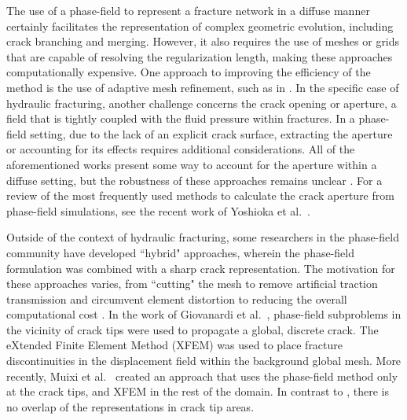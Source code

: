     The use of a phase-field to represent a fracture network in a diffuse manner certainly facilitates the representation of complex geometric evolution, including crack branching and merging. However, it also requires the use of meshes or grids that are capable of resolving the regularization length, making these approaches computationally expensive. One approach to improving the efficiency of the method is the use of adaptive mesh refinement, such as in \cite{heister2015primal, lee2017iterative, Wick-adaptive-2020,Gupta-adaptive-2022}. In the specific case of hydraulic fracturing, another challenge concerns the crack opening or aperture, a field that is tightly coupled with the fluid pressure within fractures. In a phase-field setting, due to the lack of an explicit crack surface, extracting the aperture or accounting for its effects requires additional considerations.  All of the aforementioned  works present some way to account for the aperture within a diffuse setting, but the robustness of these approaches remains unclear \cite{lecampion2018numerical}. For a review of the most frequently used methods to calculate the crack aperture from phase-field simulations, see the recent work of Yoshioka et al.\ \cite{yoshioka2020crack}.


    Outside of the context of hydraulic fracturing, some researchers in the phase-field community have developed ``hybrid" approaches, wherein the phase-field formulation was combined with a sharp crack representation. The motivation for these approaches varies, from ``cutting" the mesh to remove artificial traction transmission and circumvent element distortion \cite{geelen2018optimization} to reducing the overall computational cost \cite{giovanardi2017hybrid, muixi2021combined}. In the work of Giovanardi et al.\ \cite{giovanardi2017hybrid}, phase-field subproblems in the vicinity of  crack tips were used to propagate a global, discrete crack. The eXtended Finite Element Method (XFEM)\cite{moes1999finite} was used to place fracture discontinuities in the displacement field within the background global mesh. More recently, Muixi et al.\ \cite{muixi2021combined} created an approach that uses the phase-field method only at the crack tips, and XFEM in the rest of the domain. In contrast to \cite{giovanardi2017hybrid}, there is no overlap of the representations in crack tip areas.

